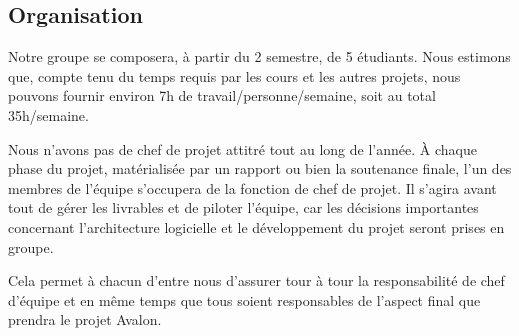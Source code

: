 \subsection{Organisation}

Notre groupe se composera, à partir du 2 semestre, de 5 étudiants. Nous estimons que, compte tenu du temps requis par les cours et les autres projets, nous pouvons fournir environ 7h de travail/personne/semaine, soit au total 35h/semaine. \newline

Nous n'avons pas de chef de projet attitré tout au long de l'année. \`A chaque phase du projet, matérialisée par un rapport ou bien la soutenance finale, l'un des membres de l'équipe s'occupera de la fonction de chef de projet. Il s'agira avant tout de gérer les livrables et de piloter l'équipe, car les décisions importantes concernant l'architecture logicielle et le développement du projet seront prises en groupe.\newline

Cela permet à chacun d'entre nous d'assurer tour à tour la responsabilité de chef d'équipe et en même temps que tous soient responsables de l'aspect final que prendra le projet Avalon. 
